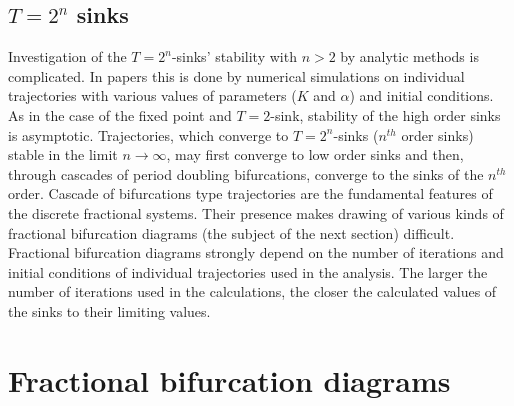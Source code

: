 \documentclass[graybox]{svmult}
\begin{document}
\subsection{$T=2^n$ sinks}
\label{T2TonSection}


Investigation of the $T=2^n$-sinks' stability with $n>2$ by analytic methods is complicated.  In papers \cite{ME2,ME3,ME4,ME6,ME7,ME8,ME9,Chaos2015,ME1,ME5} this is done by numerical simulations on individual trajectories with various values of parameters ($K$ and $\alpha$) and initial conditions. As in the case of the fixed point and $T=2$-sink, stability of the high order sinks is asymptotic. Trajectories, which converge to $T=2^n$-sinks ($n^{th}$ order sinks) stable in the limit $n \rightarrow \infty$, may first converge to low order sinks and then, through cascades of period doubling bifurcations, converge to the sinks of the $n^{th}$ order. Cascade of bifurcations type trajectories are the fundamental features of the discrete fractional systems. Their presence makes drawing of various kinds of fractional bifurcation diagrams (the subject of the next section) difficult. Fractional bifurcation diagrams strongly depend on the number of iterations and initial conditions of individual trajectories used in the analysis. The larger the number of iterations used in the calculations, the closer the calculated values of the sinks to their limiting values. 



\section{Fractional bifurcation diagrams}
\label{sec:4}
\end{document}

